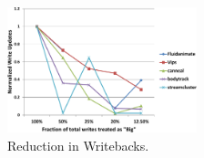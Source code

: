 \begin{figure}[t] \centering 
\centering
\includegraphics[width=0.49\textwidth]{figures/WriteUpdates-crop.pdf}
\caption{Reduction in Writebacks.}
\label{fig:writeupdates}
\end{figure}

